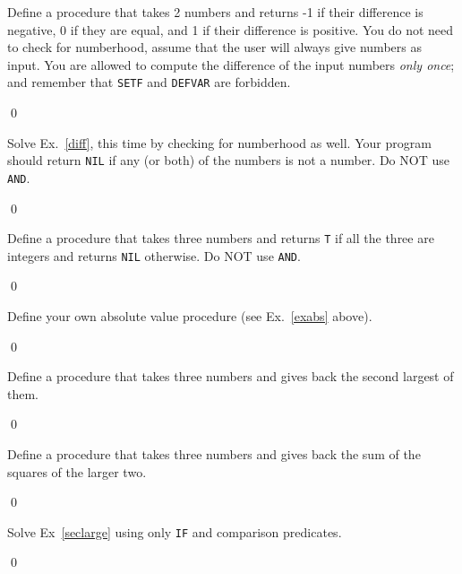 \documentclass[a4paper,11pt]{article}
\begin{document}
\noindent\hrulefill

\begin{uexercise}
\label{diff}
Define a procedure that takes 2 numbers and returns -1 if their difference is negative, 0 if they are equal, and 1 if their difference is positive. You do not need to check for numberhood, assume that the user will always give numbers as input. You are allowed to compute the difference of the input numbers \emph{only once}; and remember that \Verb+SETF+ and \Verb+DEFVAR+ are forbidden.

\qed
\end{uexercise}

\begin{uexercise}
Solve Ex.~\ref{diff}, this time by checking for numberhood as well. Your program should return \Verb+NIL+ if any (or both) of the numbers is not a number. Do NOT use \Verb+AND+. 

\qed
\end{uexercise}

\begin{uexercise}
Define a procedure that takes three numbers and returns \Verb+T+ if all the three are integers and returns \Verb+NIL+ otherwise. Do NOT use \Verb+AND+. 

\qed
\end{uexercise}


\begin{uexercise}
Define your own absolute value procedure (see Ex.\ \ref{exabs} above).

\qed
\end{uexercise}

\begin{uexercise}
\label{seclarge}
Define a procedure that takes three numbers and gives back the second largest of them. 

\qed
\end{uexercise}

\begin{uexercise}

Define a procedure that takes three numbers and gives back the sum of the squares of the larger two. 

\qed
\end{uexercise}

\begin{uexercise}

Solve Ex~\ref{seclarge} using only \Verb+IF+ and comparison predicates.

\qed
\end{uexercise}
\end{document}
